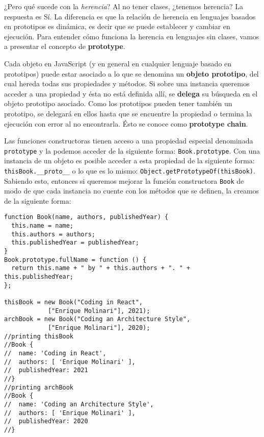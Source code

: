\documentclass[a4paper, oneside, titlepage, 12pt]{paper}
\begin{document}
¿Pero qué sucede con la \textit{herencia}? Al no tener clases, ¿tenemos herencia? La respuesta es Sí. La diferencia es que la relación de herencia en lenguajes basados en prototipos es dinámica, es decir que se puede establecer y cambiar en ejecución. Para entender cómo funciona la herencia en lenguajes sin clases, vamos a presentar el concepto de \textbf{prototype}. 
\newline

Cada objeto en JavaScript (y en general en cualquier lenguaje basado en prototipos) puede estar asociado a lo que se denomina un \textbf{objeto prototipo}, del cual hereda todas sus propiedades y métodos. Si sobre una instancia queremos acceder a una propiedad y ésta no está definida allí, se \textbf{delega} su búsqueda en el objeto prototipo asociado. Como los prototipos pueden tener también un prototipo, se delegará en ellos hasta que se encuentre la propiedad o termina la ejecución con error al no encontrarla. Ésto se conoce como \textbf{prototype chain}.
\newline

Las funciones constructoras tienen acceso a una propiedad especial denominada \texttt{prototype} y la podemos acceder de la siguiente forma: \texttt{Book.prototype}. Con una instancia de un objeto es posible acceder a esta propiedad de la siguiente forma: \texttt{thisBook.__proto__} o lo que es lo mismo: \texttt{Object.getPrototypeOf(thisBook)}. Sabiendo esto, entonces si queremos mejorar la función constructora \texttt{Book} de modo de que cada instancia no cuente con los métodos que se definen, la creamos de la siguiente forma:

\begin{verbatim}
function Book(name, authors, publishedYear) {
  this.name = name;
  this.authors = authors;
  this.publishedYear = publishedYear;
}
Book.prototype.fullName = function () {
  return this.name + " by " + this.authors + ". " + this.publishedYear;
};               
               
thisBook = new Book("Coding in React", 
			["Enrique Molinari"], 2021);
archBook = new Book("Coding an Architecture Style", 
			["Enrique Molinari"], 2020);
//printing thisBook
//Book {
//  name: 'Coding in React',
//  authors: [ 'Enrique Molinari' ],
//  publishedYear: 2021
//}
//printing archBook
//Book {
//  name: 'Coding an Architecture Style',
//  authors: [ 'Enrique Molinari' ],
//  publishedYear: 2020
//}
\end{verbatim}
\end{document}
